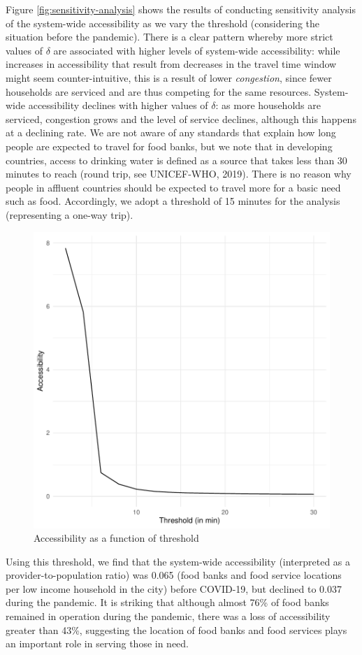 \documentclass[]{elsarticle} %
\begin{document}
Figure \ref{fig:sensitivity-analysis} shows the results of conducting
sensitivity analysis of the system-wide accessibility as we vary the
threshold (considering the situation before the pandemic). There is a
clear pattern whereby more strict values of \(\delta\) are associated
with higher levels of system-wide accessibility: while increases in
accessibility that result from decreases in the travel time window might
seem counter-intuitive, this is a result of lower \emph{congestion},
since fewer households are serviced and are thus competing for the same
resources. System-wide accessibility declines with higher values of
\(\delta\): as more households are serviced, congestion grows and the
level of service declines, although this happens at a declining rate. We
are not aware of any standards that explain how long people are expected
to travel for food banks, but we note that in developing countries,
access to drinking water is defined as a source that takes less than 30
minutes to reach (round trip, see UNICEF-WHO, 2019). There is no reason
why people in affluent countries should be expected to travel more for a
basic need such as food. Accordingly, we adopt a threshold of 15 minutes
for the analysis (representing a one-way trip).

\begin{figure}
\includegraphics[width=0.6\linewidth]{Accessibility-Foodbanks-Hamilton_files/figure-latex/plot-results-sensitivity-analysis-1} \caption{\label{fig:sensitivity-analysis}Accessibility as a function of threshold}\label{fig:plot-results-sensitivity-analysis}
\end{figure}

Using this threshold, we find that the system-wide accessibility
(interpreted as a provider-to-population ratio) was 0.065 (food banks
and food service locations per low income household in the city) before
COVID-19, but declined to 0.037 during the pandemic. It is striking that
although almost 76\% of food banks remained in operation during the
pandemic, there was a loss of accessibility greater than 43\%,
suggesting the location of food banks and food services plays an
important role in serving those in need.
\end{document}
